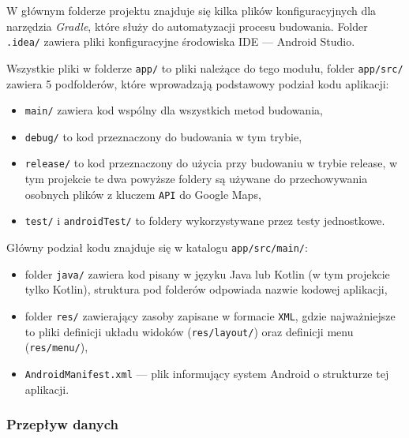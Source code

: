 \documentclass[polish,polish,a4paper,12pt]{article}
\begin{document}
		W głównym folderze projektu znajduje się kilka plików konfiguracyjnych dla narzędzia \textit{Gradle}, które służy do automatyzacji procesu budowania. Folder \texttt{.idea/} zawiera pliki konfiguracyjne środowiska IDE — Android Studio.

		Wszystkie pliki w folderze \texttt{app/} to pliki należące do tego modułu, folder \texttt{app/src/} zawiera 5 podfolderów, które wprowadzają podstawowy podział kodu aplikacji:

		\begin{itemize}
			\item \texttt{main/} zawiera kod wspólny dla wszystkich metod budowania,
			\item \texttt{debug/} to kod przeznaczony do budowania w tym trybie,
			\item \texttt{release/} to kod przeznaczony do użycia przy budowaniu w trybie release, w tym projekcie te dwa powyższe foldery są używane do przechowywania osobnych plików z kluczem \texttt{API} do Google Maps,
			\item \texttt{test/} i \texttt{androidTest/} to foldery wykorzystywane przez testy jednostkowe.
		\end{itemize}

		Główny podział kodu znajduje się w katalogu \texttt{app/src/main/}:

		\begin{itemize}
			\item folder \texttt{java/} zawiera kod pisany w języku Java lub Kotlin (w tym projekcie tylko Kotlin), struktura pod folderów odpowiada nazwie kodowej aplikacji,
			\item folder \texttt{res/} zawierający zasoby zapisane w formacie \texttt{XML}, gdzie najważniejsze to pliki definicji układu widoków (\texttt{res/layout/}) oraz definicji menu (\texttt{res/menu/}),
			\item \texttt{AndroidManifest.xml} — plik informujący system Android o strukturze tej aplikacji.
		\end{itemize}

		\subsubsection{Przepływ danych}
\end{document}
